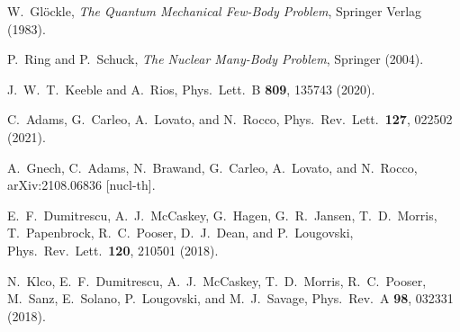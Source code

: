 \documentclass[aps,prc,reprint,superscriptaddress,nofootinbib]{revtex4-2}
\begin{document}
%

\appendix


\begin{thebibliography}{999}

W.~Gl\"ockle, \emph{The Quantum Mechanical Few-Body Problem},
Springer Verlag (1983).

P.~Ring and P.~Schuck,
\emph{The Nuclear Many-Body Problem},
Springer (2004).

J.~W.~T.~Keeble and A.~Rios,
Phys.\ Lett.\ B \textbf{809}, 135743 (2020).

C.~Adams, G.~Carleo, A.~Lovato, and N.~Rocco,
Phys.\ Rev.\ Lett.\ \textbf{127}, 022502 (2021).

A.~Gnech, C.~Adams, N.~Brawand, G.~Carleo, A.~Lovato, and N.~Rocco,
arXiv:2108.06836 [nucl-th].

E.~F.~Dumitrescu, A.~J.~McCaskey, G.~Hagen, G.~R.~Jansen, T.~D.~Morris, T.~Papenbrock, R.~C.~Pooser, D.~J.~Dean, and P.~Lougovski,
Phys.\ Rev.\ Lett.\ \textbf{120}, 210501 (2018).

N.~Klco, E.~F.~Dumitrescu, A.~J.~McCaskey, T.~D.~Morris, R.~C.~Pooser, M.~Sanz, E.~Solano, P.~Lougovski, and M.~J.~Savage,
Phys.\ Rev.\ A \textbf{98}, 032331 (2018).


\end{thebibliography}
\end{document}
